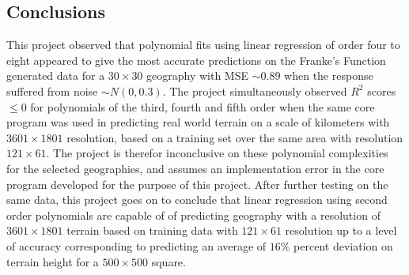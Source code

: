 \documentclass[%
oneside,                 %
final,                   %
10pt]{article}
\begin{document}
\subsection{Conclusions}
This project observed that polynomial fits using linear regression of order four to eight appeared to give the most accurate predictions on the Franke's Function generated data for a $30 \times 30$ geography with MSE $\sim 0.89$ when the response suffered from noise $\sim N(0,0.3)$. The project simultaneously observed $R^2$ scores$\leq 0$ for polynomials of the third, fourth and fifth order when the same core program was used in predicting real world terrain on a scale of kilometers with $3601 \times 1801$ resolution, based on a training set over the same area with resolution $121 \times 61$. The project is therefor inconclusive on these polynomial complexities for the selected geographies, and assumes an implementation error in the core program developed for the purpose of this project. After further testing on the same data, this project goes on to conclude that linear regression using second order polynomials are capable of of predicting geography with a resolution of  $3601 \times 1801$ terrain based on training data with $121 \times 61$ resolution up to a level of accuracy corresponding to predicting an average of $16\%$ percent deviation on terrain height for a $500 \times 500$ square.






\end{document}
